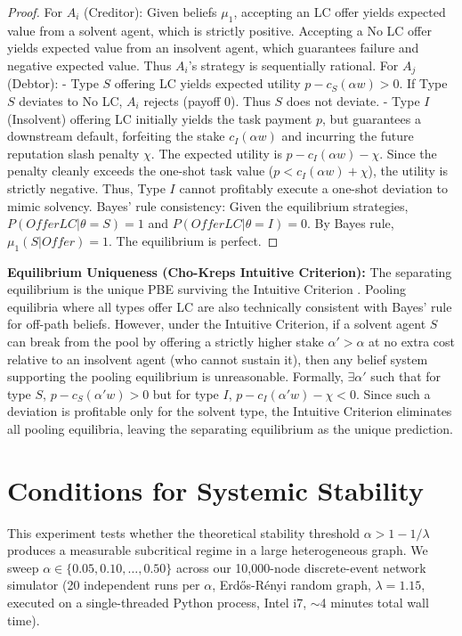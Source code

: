 \documentclass[11pt]{article}
\begin{document}
\begin{proof}
For $A_i$ (Creditor): Given beliefs $\mu_1$, accepting an LC offer yields expected value from a solvent agent, which is strictly positive. Accepting a No LC offer yields expected value from an insolvent agent, which guarantees failure and negative expected value. Thus $A_i$'s strategy is sequentially rational.
For $A_j$ (Debtor):
- Type $S$ offering LC yields expected utility $p - c_S(\alpha w) > 0$. If Type $S$ deviates to No LC, $A_i$ rejects (payoff 0). Thus $S$ does not deviate.
- Type $I$ (Insolvent) offering LC initially yields the task payment $p$, but guarantees a downstream default, forfeiting the stake $c_I(\alpha w)$ and incurring the future reputation slash penalty $\chi$. The expected utility is $p - c_I(\alpha w) - \chi$. Since the penalty cleanly exceeds the one-shot task value ($p < c_I(\alpha w) + \chi$), the utility is strictly negative. Thus, Type $I$ cannot profitably execute a one-shot deviation to mimic solvency.
Bayes' rule consistency: Given the equilibrium strategies, $P(Offer LC | \theta=S) = 1$ and $P(Offer LC | \theta=I) = 0$. By Bayes rule, $\mu_1(S | Offer) = 1$. The equilibrium is perfect.
\end{proof}

\textbf{Equilibrium Uniqueness (Cho-Kreps Intuitive Criterion):} The separating equilibrium is the unique PBE surviving the Intuitive Criterion \cite{cho1987}. Pooling equilibria where all types offer LC are also technically consistent with Bayes' rule for off-path beliefs. However, under the Intuitive Criterion, if a solvent agent $S$ can break from the pool by offering a strictly higher stake $\alpha' > \alpha$ at no extra cost relative to an insolvent agent (who cannot sustain it), then any belief system supporting the pooling equilibrium is unreasonable. Formally, $\exists \alpha'$ such that for type $S$, $p - c_S(\alpha' w) > 0$ but for type $I$, $p - c_I(\alpha' w) - \chi < 0$. Since such a deviation is profitable only for the solvent type, the Intuitive Criterion eliminates all pooling equilibria, leaving the separating equilibrium as the unique prediction.

\section{Conditions for Systemic Stability}
This experiment tests whether the theoretical stability threshold $\alpha > 1 - 1/\lambda$ produces a measurable subcritical regime in a large heterogeneous graph. We sweep $\alpha \in \{0.05, 0.10, \ldots, 0.50\}$ across our 10,000-node discrete-event network simulator (20 independent runs per $\alpha$, Erd\H{o}s-R\'enyi random graph, $\lambda=1.15$, executed on a single-threaded Python process, Intel i7, $\sim$4 minutes total wall time).
\end{document}

